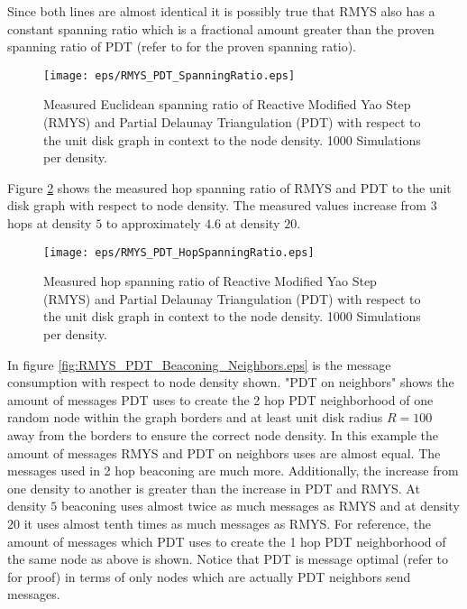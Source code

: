 Since both lines are almost identical it is possibly true that RMYS also has a constant spanning ratio which is a fractional amount greater than the proven spanning ratio of PDT (refer to \cite{Neumann2012} for the proven spanning ratio).

\begin{figure}[h!]
\centering
\texttt{[image: eps/RMYS\_PDT\_SpanningRatio.eps]}
\caption{Measured Euclidean spanning ratio of Reactive Modified Yao Step (RMYS) and Partial Delaunay Triangulation (PDT) with respect to the unit disk graph in context to the node density. 1000 Simulations per density.}
\label{fig:RMYS_PDT_SpanningRatio}
\end{figure}


Figure \ref{fig:RMYS_PDT_HopSpanningRatio} shows the measured hop spanning ratio of RMYS and PDT to the unit disk graph with respect to node density.
The measured values increase from $3 $ hops at density $5 $ to approximately $4.6 $ at density $20 $.

\begin{figure}[h!]
\centering
\texttt{[image: eps/RMYS\_PDT\_HopSpanningRatio.eps]}
\caption{Measured hop spanning ratio of Reactive Modified Yao Step (RMYS) and Partial Delaunay Triangulation (PDT) with respect to the unit disk graph in context to the node density. 1000 Simulations per density.}
\label{fig:RMYS_PDT_HopSpanningRatio}
\end{figure}



In figure \ref{fig:RMYS_PDT_Beaconing_Neighbors.eps} is the message consumption with respect to node density shown.
"PDT on neighbors" shows the amount of messages PDT uses to create the 2 hop PDT neighborhood of one random node within the graph borders and at least unit disk radius $R=100 $ away from the borders to ensure the correct node density.
In this example the amount of messages RMYS and PDT on neighbors uses are almost equal.
The messages used in 2 hop beaconing are much more.
Additionally, the increase from one density to another is greater than the increase in PDT and RMYS.
At density $5 $ beaconing uses almost twice as much messages as RMYS and at density $20 $ it uses almost tenth times as much messages as RMYS.
For reference, the amount of messages which PDT uses to create the 1 hop PDT neighborhood of the same node as above is shown.
Notice that PDT is message optimal (refer to \cite{Benter2013} for proof) in terms of only nodes which are actually PDT neighbors send messages.

